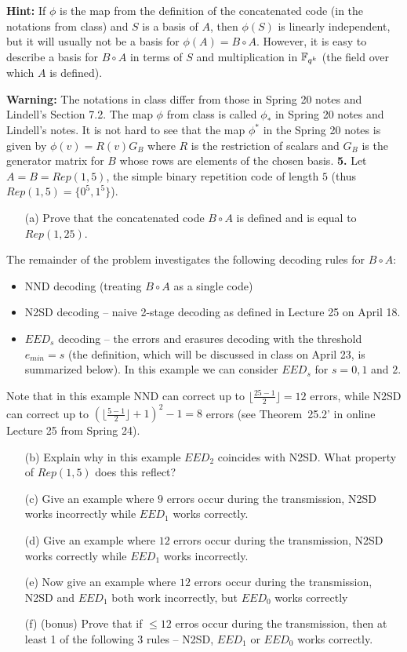 \documentclass[12pt]{amsart}
\begin{document}
{\bf Hint:} If $\phi$ is the map from the definition of the concatenated code (in the notations from class)
and $S$ is a basis of $A$, then $\phi(S)$ is linearly independent, but it will usually not be a basis for $\phi(A)=B\circ A$. However, it is easy to describe a basis for $B\circ A$ in terms of $S$ and multiplication in ${\mathbb F}_{q^k}$ (the field over which
$A$ is defined).
\skv

{\bf Warning:} The notations in class differ from those in Spring 20 notes and Lindell's Section 7.2. The map $\phi$ from class
is called $\phi_*$ in Spring 20 notes and Lindell's notes. It is not hard to see that the map $\phi^*$ in the Spring 20 notes is given by $\phi(v)=R(v)G_B$ where $R$ is the restriction of scalars and $G_B$ is the generator matrix for $B$ whose rows are elements of the chosen basis.
\skv
{\bf 5.} Let $A=B=Rep(1,5)$, the simple binary repetition code of length $5$ (thus $Rep(1,5)=\{0^5,1^5\}$).
\begin{itemize}
\item[(a)] Prove that the concatenated code $B\circ A$ is defined and is equal to $Rep(1,25)$. 
\end{itemize}
The remainder of the problem investigates the following decoding rules for $B\circ A$:
\begin{itemize}
\item NND decoding (treating $B\circ A$ as a single code)
\item N2SD decoding -- naive 2-stage decoding as defined in Lecture 25 on April 18.
\item $EED_s$ decoding -- the errors and erasures decoding with the threshold $e_{min}=s$ (the definition, which will be discussed in class on April 23, is summarized below). In this example we can consider $EED_s$ for $s=0,1$ and $2$.
\end{itemize}
Note that in this example NND can correct up to $\lfloor \frac{25-1}{2}\rfloor=12$ errors, while N2SD can correct up
to $(\lfloor \frac{5-1}{2}\rfloor+1)^2-1=8$ errors (see Theorem~25.2' in online Lecture 25 from Spring 24).
\begin{itemize}
\item[(b)] Explain why in this example $EED_2$ coincides with N2SD. What property of $Rep(1,5)$ does this reflect?
\item[(c)] Give an example where $9$ errors occur during the transmission, N2SD works incorrectly while $EED_1$ works correctly.
\item[(d)] Give an example where  $12$ errors occur during the transmission, N2SD works correctly while $EED_1$ works incorrectly.
\item[(e)] Now give an example where $12$ errors occur during the transmission, N2SD and $EED_1$ both work incorrectly, but
$EED_0$ works correctly
\item[(f)] (bonus) Prove that if $\leq 12$ erros occur during the transmission, then at least 1 of the following 3 rules -- N2SD,
$EED_1$ or $EED_0$ works correctly.
\end{itemize}
\end{document}
